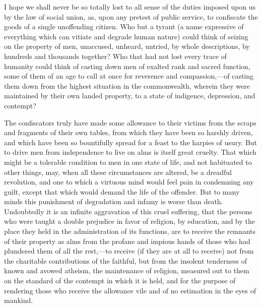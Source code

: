 I hope we shall never be so totally lost to all sense of the duties imposed upon us by the law of social union, as, upon any pretest of public service, to confiscate the goods of a single unoffending citizen. Who but a tyrant (a name expressive of everything which can vitiate and degrade human nature) could think of seizing on the property of men, unaccused, unheard, untried, by whole descriptions, by hundreds and thousands together? Who that had not lost every trace of humanity could think of casting down men of exalted rank and sacred function, some of them of an age to call at once for reverence and compassion,—of casting them down from the highest situation in the commonwealth, wherein they were maintained by their own landed property, to a state of indigence, depression, and contempt?

The confiscators truly have made some allowance to their victims from the scraps and fragments of their own tables, from which they have been so harshly driven, and which have been so bountifully spread for a feast to the harpies of usury. But to drive men from independence to live on alms is itself great cruelty. That which might be a tolerable condition to men in one state of life, and not habituated to other things, may, when all these circumstances are altered, be a dreadful revolution, and one to which a virtuous mind would feel pain in condemning any guilt, except that which would demand the life of the offender. But to many minds this punishment of degradation and infamy is worse than death. Undoubtedly it is an infinite aggravation of this cruel suffering, that the persons who were taught a double prejudice in favor of religion, by education, and by the place they held in the administration of its functions, are to receive the remnants of their property as alms from the profane and impious hands of those who had plundered them of all the rest,—to receive (if they are at all to receive) not from the charitable contributions of the faithful, but from the insolent tenderness of known and avowed atheism, the maintenance of religion, measured out to them on the standard of the contempt in which it is held, and for the purpose of rendering those who receive the allowance vile and of no estimation in the eyes of mankind.

